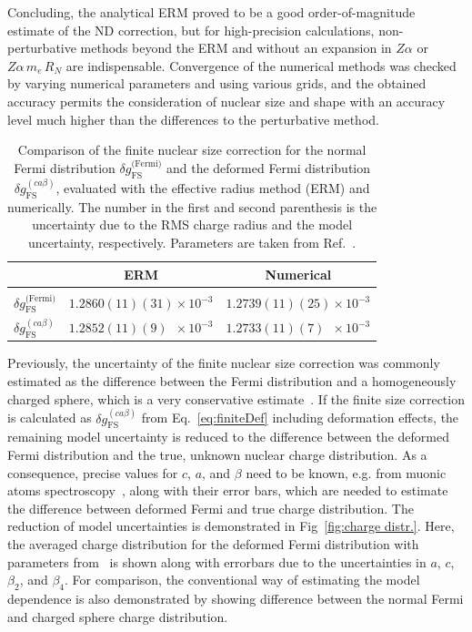 Concluding, the analytical ERM proved to be a good order-of-magnitude estimate of the ND correction, but for high-precision calculations, non-perturbative methods beyond the ERM and without an expansion in $Z\alpha$ or $Z\alpha\, m_e\, R_N$ are indispensable. Convergence of the numerical methods was checked by varying numerical parameters and using various grids, and the obtained accuracy permits the consideration of nuclear size and shape with an accuracy level much higher than the differences to the perturbative method.

\begin{table}[t]
\caption{\label{tab:uranium}%
Comparison of the finite nuclear size correction for the normal Fermi distribution $\delta g_{\text{FS}}^{\text{(Fermi)}}$ and the deformed Fermi distribution $\delta g^{(ca\beta)}_{\text{FS}}$, evaluated with the effective radius method (ERM) and numerically. The number in the first and second parenthesis is the uncertainty due to the RMS charge radius and the model uncertainty, respectively. Parameters are taken from Ref.~\cite{kozhedub2008}.
}
\centering
\begin{tabular}{lcc}
&ERM&Numerical\\\hline\\
$\delta g_{\text{FS}}^{\text{(Fermi)}}$&$1.2860(11)(31)\times 10^{-3}$&$1.2739(11)(25)\times 10^{-3}$\\[0.4cm]
$\delta g^{(ca\beta)}_{\text{FS}}$&$1.2852(11)(9)\phantom{0}\times 10^{-3}$&$1.2733(11)(7)\phantom{0}\times 10^{-3}$
\end{tabular}
\end{table}
Previously, the uncertainty of the finite nuclear size correction was commonly estimated as the difference between the Fermi distribution and a homogeneously charged sphere, which is a very conservative estimate~\cite{Shabaev2006}. If the finite size correction is calculated as $\delta g^{(ca\beta)}_{\text{FS}}$ from Eq.~\eqref{eq:finiteDef} including deformation effects, the remaining model uncertainty is reduced to the difference between the deformed Fermi distribution and the true, unknown nuclear charge distribution.
As a consequence, precise values for $c$, $a$, and $\beta$ need to be known, e.g. from muonic atoms spectroscopy~\cite{Close1978,hitlin1970}, along with their error bars, which are needed to estimate the difference between deformed Fermi and true charge distribution. 
The reduction of model uncertainties is demonstrated in Fig~\ref{fig:charge distr.}. Here, the averaged charge distribution for the deformed Fermi distribution with parameters from~\cite{kozhedub2008} is shown along with errorbars due to the uncertainties in $a$, $c$, $\beta_2$, and $\beta_4$. For comparison, the conventional way of estimating the model dependence is also demonstrated by showing difference between the normal Fermi and charged sphere charge distribution.

